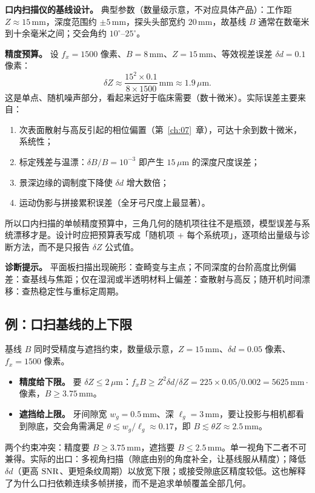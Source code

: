 \textbf{口内扫描仪的基线设计。} 典型参数（数量级示意，不对应具体产品）：工作距 $Z\approx15\,\mathrm{mm}$，深度范围约 $\pm5\,\mathrm{mm}$，探头头部宽约 $20\,\mathrm{mm}$，故基线 $B$ 通常在数毫米到十余毫米之间；交会角约 $10^\circ$--$25^\circ$。

\textbf{精度预算。} 设 $f_x=1500$ 像素、$B=8\,\mathrm{mm}$、$Z=15\,\mathrm{mm}$、等效视差误差 $\delta d=0.1$ 像素：
\[
  \delta Z\approx\frac{15^2\times0.1}{8\times1500}\,\mathrm{mm}\approx1.9\,\mu\mathrm{m}.
\]
这是单点、随机噪声部分，看起来远好于临床需要（数十微米）。实际误差主要来自：
\begin{enumerate}
  \item 次表面散射与高反引起的相位偏置（第~\ref{ch:07}~章），可达十余到数十微米，系统性；
  \item 标定残差与温漂：$\delta B/B=10^{-3}$ 即产生 $15\,\mu\mathrm{m}$ 的深度尺度误差；
  \item 景深边缘的调制度下降使 $\delta d$ 增大数倍；
  \item 运动伪影与拼接累积误差（全牙弓尺度上最显著）。
\end{enumerate}
所以口内扫描的单帧精度预算中，三角几何的随机项往往不是瓶颈，模型误差与系统漂移才是。设计时应把预算表写成「随机项 + 每个系统项」，逐项给出量级与诊断方法，而不是只报告 $\delta Z$ 公式值。

\textbf{诊断提示。} 平面板扫描出现碗形：查畸变与主点；不同深度的台阶高度比例偏差：查基线与焦距；仅在湿润或半透明材料上偏差：查散射与高反；随开机时间漂移：查热稳定性与重标定周期。

\subsection{例：口扫基线的上下限}

基线 $B$ 同时受精度与遮挡约束，数量级示意，$Z=15\,\mathrm{mm}$、$\delta d=0.05$ 像素、$f_x=1500$ 像素。
\begin{itemize}
  \item \textbf{精度给下限。} 要 $\delta Z\le2\,\mu\mathrm{m}$：$f_xB\ge Z^2\delta d/\delta Z=225\times0.05/0.002=5625\,\mathrm{mm}\cdot$像素，$B\ge3.75\,\mathrm{mm}$。
  \item \textbf{遮挡给上限。} 牙间隙宽 $w_g=0.5\,\mathrm{mm}$、深 $\ell_g=3\,\mathrm{mm}$，要让投影与相机都看到隙底，交会角需满足 $\theta\lesssim w_g/\ell_g\approx0.17$，即 $B\lesssim\theta Z\approx2.5\,\mathrm{mm}$。
\end{itemize}
两个约束冲突：精度要 $B\ge3.75\,\mathrm{mm}$，遮挡要 $B\le2.5\,\mathrm{mm}$。单一视角下二者不可兼得。实际的出口：多视角扫描（隙底由别的角度补全，让基线服从精度）；降低 $\delta d$（更高 $\mathrm{SNR}$、更短条纹周期）以放宽下限；或接受隙底区精度较低。这也解释了为什么口扫依赖连续多帧拼接，而不是追求单帧覆盖全部几何。

